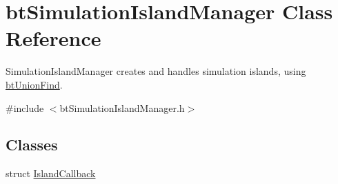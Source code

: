 \hypertarget{classbtSimulationIslandManager}{}\section{bt\+Simulation\+Island\+Manager Class Reference}
\label{classbtSimulationIslandManager}


Simulation\+Island\+Manager creates and handles simulation islands, using \hyperlink{classbtUnionFind}{bt\+Union\+Find}.  




{\ttfamily \#include $<$bt\+Simulation\+Island\+Manager.\+h$>$}

\subsection*{Classes}
\begin{DoxyCompactItemize}
\item 
struct \hyperlink{structbtSimulationIslandManager_1_1IslandCallback}{Island\+Callback}
\end{DoxyCompactItemize}
